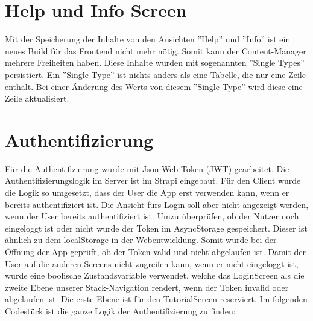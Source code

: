\section{Help und Info Screen}

Mit der Speicherung der Inhalte von den Ansichten ''Help'' und ''Info''  ist ein neues Build für das Frontend nicht mehr nötig.
Somit kann der Content-Manager mehrere Freiheiten haben.
Diese Inhalte wurden mit sogenannten ''Single Types'' persistiert.
Ein ''Single Type'' ist nichts anders als eine Tabelle, die nur eine Zeile enthält.
Bei einer Änderung des Werts von diesem ''Single Type'' wird diese eine Zeile aktualisiert.

\section{Authentifizierung}
Für die Authentifizierung wurde mit Json Web Token (JWT) gearbeitet. Die Authentifizierungslogik im Server ist im Strapi eingebaut. Für den Client wurde die Logik so umgesetzt, dass der User die App erst verwenden kann, wenn er bereits authentifiziert ist.
Die Ansicht fürs Login soll aber nicht angezeigt werden, wenn der User bereits authentifiziert ist.
Umzu überprüfen, ob der Nutzer noch eingeloggt ist oder nicht wurde der Token im AsyncStorage gespeichert. Dieser ist ähnlich zu dem localStorage in der Webentwicklung. Somit wurde bei der Öffnung der App geprüft, ob der Token valid und nicht abgelaufen ist.
Damit der User auf die anderen Screens nicht zugreifen kann, wenn er nicht eingeloggt ist, wurde eine boolische Zustandsvariable verwendet, welche das LoginScreen als die zweite Ebene unserer Stack-Navigation rendert, wenn der Token invalid oder abgelaufen ist. Die erste Ebene ist für den TutorialScreen reserviert.
Im folgenden Codestück ist die ganze Logik der Authentifizierung zu finden:
